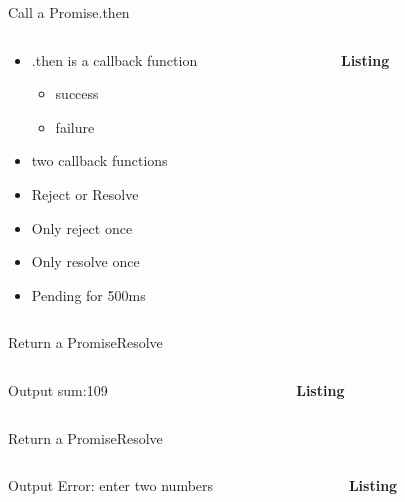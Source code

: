\documentclass[pdf,table]{beamer}
\begin{document}
%
\begin{frame}{Call a Promise}{.then}
	\begin{columns}[T]
		\begin{column}{0.35\textwidth}
			\begin{itemize}
				\item .then is a callback function 
					\begin{itemize}
						\item success
						\item failure
						\end{itemize}
				\item two callback functions
				\item Reject or Resolve
				\item Only reject once
				\item Only resolve once
				\item Pending for 500ms
			\end{itemize}
		\end{column}
		\begin{column}{0.55\textwidth}
			{\bf Listing}
			
		\end{column}
	\end{columns}	
\end{frame}

%
\begin{frame}{Return a Promise}{Resolve}
	\begin{columns}[T]
		\begin{column}{0.2\textwidth}
			\begin{block}{Output}
				sum:109
			\end{block}
		\end{column}
		\begin{column}{0.75\textwidth}
			{\bf Listing}
			
		\end{column}
	\end{columns}	
\end{frame}

%
\begin{frame}{Return a Promise}{Resolve}
	\begin{columns}[T]
		\begin{column}{0.20\textwidth}
			\begin{block}{Output}
				Error: enter two numbers	
			\end{block}
		\end{column}
		\begin{column}{0.75\textwidth}
			{\bf Listing}
			
		\end{column}
	\end{columns}	
\end{frame}
\end{document}

